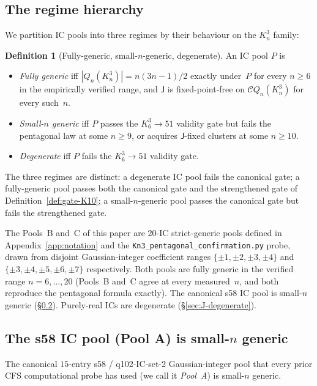 \documentclass[12pt,a4paper]{article}
\theoremstyle{definition}
\newtheorem{definition}[theorem]{Definition}
\theoremstyle{remark}
\newcommand{\Kn}{K_n^3}
\newcommand{\Qn}{Q_n}
\newcommand{\Ccls}{\mathcal{C}}             %
\newcommand{\Jconj}{\mathsf{J}}             %
\begin{document}
\subsection{The regime hierarchy}\label{sec:ic-hierarchy}

We partition IC pools into three regimes by their behaviour on the
$\Kn$ family:

\begin{definition}[Fully-generic, small-$n$-generic, degenerate]
\label{def:regimes}
An IC pool $P$ is
\begin{itemize}[leftmargin=2em,topsep=2pt,itemsep=2pt]
\item \emph{Fully generic} iff $|\Qn(\Kn)| = n(3n{-}1)/2$ exactly
under~$P$ for every $n \ge 6$ in the empirically verified range, and
$\Jconj$ is fixed-point-free on $\Ccls\Qn(\Kn)$ for every such~$n$.
\item \emph{Small-$n$ generic} iff $P$ passes the $K_6^3 \to 51$
validity gate but fails the pentagonal law at some $n \ge 9$, or
acquires $\Jconj$-fixed clusters at some $n \ge 10$.
\item \emph{Degenerate} iff $P$ fails the $K_6^3 \to 51$ validity
gate.
\end{itemize}
\end{definition}

The three regimes are distinct: a degenerate IC pool fails the
canonical gate; a fully-generic pool passes both the canonical gate
and the strengthened gate of Definition~\ref{def:gate-K10}; a
small-$n$-generic pool passes the canonical gate but fails the
strengthened gate.

The Pools~B and~C of this paper are $20$-IC strict-generic pools
defined in Appendix~\ref{app:notation} and the
\texttt{Kn3\_pentagonal\_confirmation.py} probe, drawn from
disjoint Gaussian-integer coefficient ranges $\{\pm 1, \pm 2, \pm 3,
\pm 4\}$ and $\{\pm 3, \pm 4, \pm 5, \pm 6, \pm 7\}$ respectively.
Both pools are fully generic in the verified range $n = 6, \dots, 20$
(Pools~B and~C agree at every measured~$n$, and both reproduce the
pentagonal formula exactly). The canonical s58 IC pool is small-$n$
generic (\S\ref{sec:ic-PoolA}). Purely-real ICs are degenerate
(\S\ref{sec:J-degenerate}).

\subsection{The s58 IC pool (Pool A) is small-$n$ generic}
\label{sec:ic-PoolA}

The canonical $15$-entry s58 / q102-IC-set-2 Gaussian-integer pool
that every prior CFS computational probe has used (we call it
\emph{Pool~A}) is small-$n$ generic.
\end{document}
